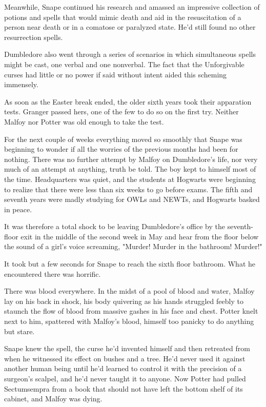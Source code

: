 \documentclass[a4paper,11pt]{article}
\begin{document}
Meanwhile, Snape continued his research and amassed an impressive collection of potions and spells that would mimic death and aid in the resuscitation of a person near death or in a comatose or paralyzed state. He'd still found no other resurrection spells.

Dumbledore also went through a series of scenarios in which simultaneous spells might be cast, one verbal and one nonverbal. The fact that the Unforgivable curses had little or no power if said without intent aided this scheming immensely.

As soon as the Easter break ended, the older sixth years took their apparation tests. Granger passed hers, one of the few to do so on the first try. Neither Malfoy nor Potter was old enough to take the test.

For the next couple of weeks everything moved so smoothly that Snape was beginning to wonder if all the worries of the previous months had been for nothing. There was no further attempt by Malfoy on Dumbledore's life, nor very much of an attempt at anything, truth be told. The boy kept to himself most of the time. Headquarters was quiet, and the students at Hogwarts were beginning to realize that there were less than six weeks to go before exams. The fifth and seventh years were madly studying for OWLs and NEWTs, and Hogwarts basked in peace.

It was therefore a total shock to be leaving Dumbledore's office by the seventh-floor exit in the middle of the second week in May and hear from the floor below the sound of a girl's voice screaming, "Murder! Murder in the bathroom! Murder!"

It took but a few seconds for Snape to reach the sixth floor bathroom. What he encountered there was horrific.

There was blood everywhere. In the midst of a pool of blood and water, Malfoy lay on his back in shock, his body quivering as his hands struggled feebly to staunch the flow of blood from massive gashes in his face and chest. Potter knelt next to him, spattered with Malfoy's blood, himself too panicky to do anything but stare.

Snape knew the spell, the curse he'd invented himself and then retreated from when he witnessed its effect on bushes and a tree. He'd never used it against another human being until he'd learned to control it with the precision of a surgeon's scalpel, and he'd never taught it to anyone. Now Potter had pulled Sectumsempra from a book that should not have left the bottom shelf of its cabinet, and Malfoy was dying.
\end{document}
